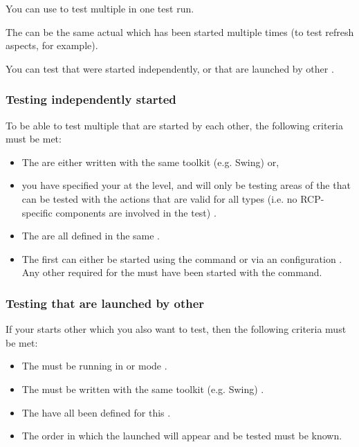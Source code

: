 You can use \app{} to test multiple \gdauts{} in one test run.

The \gdauts{} can be the same actual \gdaut{} which has been started multiple times (to test refresh aspects, for example). 

You can test \gdauts{} that were started independently, or \gdauts{} that are launched by other \gdauts{}.



\subsubsection{Testing independently started \gdauts{}}

To be able to test multiple \gdauts{} that are  started by each other, the following criteria must be met:

\begin{itemize}
\item The \gdauts{} are either written with the same toolkit (e.g. Swing) or,
\item you have specified your \gdproject{} at the  level, and will only be testing areas of the \gdauts{} that can be tested with the actions that are valid for all \gdaut{} types (i.e. no RCP-specific components are involved in the test) . 
\item The \gdauts{} are all defined in the same \gdproject{}.
\item The first \gdaut{} can either be started using the  command  or via an \gdaut{} configuration . Any other \gdauts{} required for the \gdjob{} must have been started with the  command.
\end{itemize}

\subsubsection{Testing \gdauts{} that are launched by other \gdauts{}}
\label{TasksLenientTest}

If your \gdaut{} starts other \gdauts{} which you also want to test, then the following criteria must be met:

\begin{itemize}
\item The \gdagent{} must be running in  or  mode .
\item The \gdauts{} must be written with the same toolkit (e.g. Swing) .
\item The \gdauts{} have all been defined for this .
\item The order in which the launched \gdauts{} will appear and be tested must be known.
\end{itemize}

